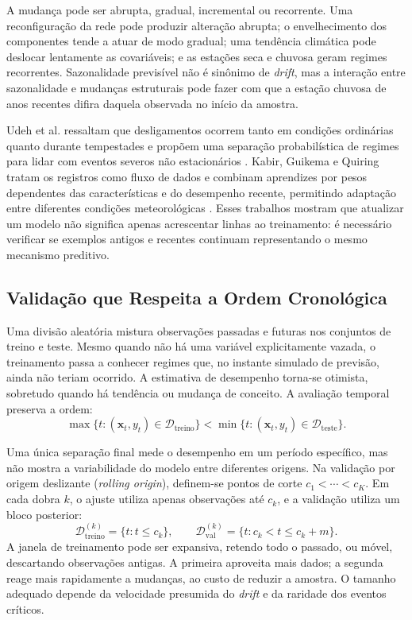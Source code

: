 A mudança pode ser abrupta, gradual, incremental ou recorrente. Uma reconfiguração da rede pode produzir alteração abrupta; o envelhecimento dos componentes tende a atuar de modo gradual; uma tendência climática pode deslocar lentamente as covariáveis; e as estações seca e chuvosa geram regimes recorrentes. Sazonalidade previsível não é sinônimo de \textit{drift}, mas a interação entre sazonalidade e mudanças estruturais pode fazer com que a estação chuvosa de anos recentes difira daquela observada no início da amostra.

Udeh et al. ressaltam que desligamentos ocorrem tanto em condições ordinárias quanto durante tempestades e propõem uma separação probabilística de regimes para lidar com eventos severos não estacionários \cite{udeh2024probabilistic}. Kabir, Guikema e Quiring tratam os registros como fluxo de dados e combinam aprendizes por pesos dependentes das características e do desempenho recente, permitindo adaptação entre diferentes condições meteorológicas \cite{kabir2024datastreams}. Esses trabalhos mostram que atualizar um modelo não significa apenas acrescentar linhas ao treinamento: é necessário verificar se exemplos antigos e recentes continuam representando o mesmo mecanismo preditivo.

\subsection{Validação que Respeita a Ordem Cronológica}

Uma divisão aleatória mistura observações passadas e futuras nos conjuntos de treino e teste. Mesmo quando não há uma variável explicitamente vazada, o treinamento passa a conhecer regimes que, no instante simulado de previsão, ainda não teriam ocorrido. A estimativa de desempenho torna-se otimista, sobretudo quando há tendência ou mudança de conceito. A avaliação temporal preserva a ordem:
\begin{equation}
    \max\{t:(\mathbf{x}_t,y_t)\in\mathcal{D}_{\mathrm{treino}}\}
    <
    \min\{t:(\mathbf{x}_t,y_t)\in\mathcal{D}_{\mathrm{teste}}\}.
    \label{eq:ordem_temporal}
\end{equation}

Uma única separação final mede o desempenho em um período específico, mas não mostra a variabilidade do modelo entre diferentes origens. Na validação por origem deslizante (\textit{rolling origin}), definem-se pontos de corte $c_1<\cdots<c_K$. Em cada dobra $k$, o ajuste utiliza apenas observações até $c_k$, e a validação utiliza um bloco posterior:
\begin{equation}
\mathcal{D}_{\mathrm{treino}}^{(k)}=\{t:t\leq c_k\},
\qquad
\mathcal{D}_{\mathrm{val}}^{(k)}=\{t:c_k<t\leq c_k+m\}.
\label{eq:rolling_origin}
\end{equation}
A janela de treinamento pode ser expansiva, retendo todo o passado, ou móvel, descartando observações antigas. A primeira aproveita mais dados; a segunda reage mais rapidamente a mudanças, ao custo de reduzir a amostra. O tamanho adequado depende da velocidade presumida do \textit{drift} e da raridade dos eventos críticos.

